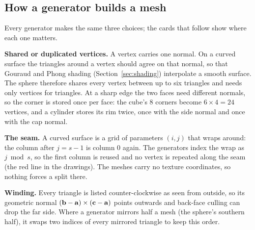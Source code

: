 \subsection{How a generator builds a mesh}
\label{sec:primverts}
Every generator makes the same three choices; the cards that follow show where each one matters.

\textbf{Shared or duplicated vertices.} A vertex carries one normal. On a curved surface the triangles around a vertex
should agree on that normal, so that Gouraud and Phong shading (Section~\ref{sec:shading}) interpolate a smooth
surface. The sphere therefore shares every vertex between up to six triangles and needs only \nSphereV{} vertices for
\nSphereTri{} triangles. At a sharp edge the two faces need different normals, so the corner is stored once per face:
the cube's 8 corners become $6\times4=24$ vertices, and a cylinder stores its rim twice, once with the side normal and
once with the cap normal.

\textbf{The seam.} A curved surface is a grid of parameters $(i,j)$ that wraps around: the column after $j=s-1$ is
column $0$ again. The generators index the wrap as $j \bmod s$, so the first column is reused and no vertex is
repeated along the seam (the red line in the drawings). The meshes carry no texture coordinates, so nothing forces a
split there.

\textbf{Winding.} Every triangle is listed counter-clockwise as seen from outside, so its geometric normal
$(\mathbf{b}-\mathbf{a})\times(\mathbf{c}-\mathbf{a})$ points outwards and back-face culling can drop the far side. Where a
generator mirrors half a mesh (the sphere's southern half), it swaps two indices of every mirrored triangle to keep this
order.

